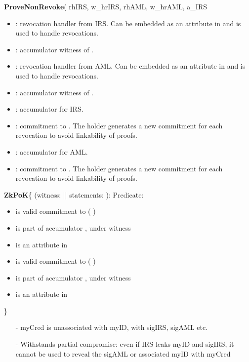 \vspace{.5em}\textbf{ProveNonRevoke}( rhIRS, w\_hrIRS, rhAML, w\_hrAML, a\_IRS
\begin{itemize}
    \item {}: revocation handler from IRS. Can be embedded as an attribute in  and is used to handle revocations.
    \item {}: accumulator witness of .
    \item {}: revocation handler from AML. Can be embedded as an attribute in  and is used to handle revocations.
    \item {}: accumulator witness of .
    \item {}: accumulator for IRS.
    \item {}: commitment to . The holder generates a new commitment for each revocation to avoid linkability of proofs. 
    \item {}: accumulator for AML.
    \item {}: commitment to . The holder generates a new commitment for each revocation to avoid linkability of proofs. 
\end{itemize}


\vspace{.5em}
\textbf{ZkPoK}\{ (witness: || statements:  ):
Predicate:
	\begin{itemize}[label={- }]
	\item {} is valid commitment to (  )
	\item {} is part of accumulator , under witness 
	\item {} is an attribute in 
	\item {} is valid commitment to (  )
	\item {} is part of accumulator , under witness 
	\item {} is an attribute in 
	\end{itemize}
\}

	\begin{itemize}
		\item[- ] myCred is unassociated with myID, with sigIRS, sigAML etc.
    \item[- ] Withstands partial compromise: even if IRS leaks myID and sigIRS, it cannot be used to reveal the sigAML or associated myID with myCred
	\end{itemize}


